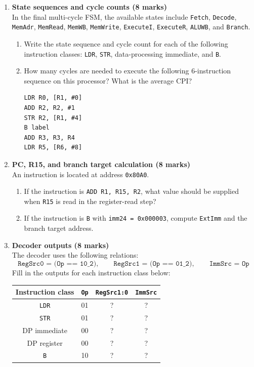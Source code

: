 \documentclass[11pt]{article}
\begin{document}
\begin{enumerate}[label=\textbf{B\arabic*.}]
  \item \textbf{State sequences and cycle counts (8 marks)}\\
  In the final multi-cycle FSM, the available states include \texttt{Fetch}, \texttt{Decode}, \texttt{MemAdr}, \texttt{MemRead}, \texttt{MemWB}, \texttt{MemWrite}, \texttt{ExecuteI}, \texttt{ExecuteR}, \texttt{ALUWB}, and \texttt{Branch}.
  \begin{enumerate}[label=(\alph*)]
    \item Write the state sequence and cycle count for each of the following instruction classes: \texttt{LDR}, \texttt{STR}, data-processing immediate, and \texttt{B}.
    \item How many cycles are needed to execute the following 6-instruction sequence on this processor? What is the average CPI?
\begin{verbatim}
LDR R0, [R1, #0]
ADD R2, R2, #1
STR R2, [R1, #4]
B label
ADD R3, R3, R4
LDR R5, [R6, #8]
\end{verbatim}
  \end{enumerate}

  \item \textbf{PC, R15, and branch target calculation (8 marks)}\\
  An instruction is located at address \texttt{0x80A0}.
  \begin{enumerate}[label=(\alph*)]
    \item If the instruction is \texttt{ADD R1, R15, R2}, what value should be supplied when \texttt{R15} is read in the register-read step?
    \item If the instruction is \texttt{B} with \texttt{imm24 = 0x000003}, compute \texttt{ExtImm} and the branch target address.
  \end{enumerate}

  \item \textbf{Decoder outputs (8 marks)}\\
  The decoder uses the following relations:
  \[
    \texttt{RegSrc0 = (Op == 10\_2)}, \qquad
    \texttt{RegSrc1 = (Op == 01\_2)}, \qquad
    \texttt{ImmSrc = Op}
  \]
  Fill in the outputs for each instruction class below:
  \begin{center}
  \begin{tabular}{c|c|c|c}
  Instruction class & \texttt{Op} & \texttt{RegSrc1:0} & \texttt{ImmSrc} \\ \hline
  \texttt{LDR} & 01 & ? & ? \\
  \texttt{STR} & 01 & ? & ? \\
  DP immediate & 00 & ? & ? \\
  DP register & 00 & ? & ? \\
  \texttt{B} & 10 & ? & ? \\
  \end{tabular}
  \end{center}


\end{enumerate}
\end{document}
